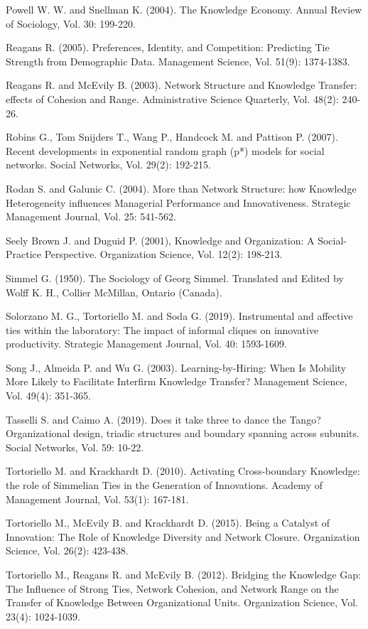 \documentclass{article}
\begin{document}
\begin{hangparas}{.25in}{1}
Powell W. W. and Snellman K. (2004). The Knowledge Economy. Annual Review of Sociology, Vol. 30: 199-220.

Reagans R. (2005). Preferences, Identity, and Competition: Predicting Tie Strength from Demographic Data. Management Science, Vol. 51(9): 1374-1383.

Reagans R. and McEvily B. (2003). Network Structure and Knowledge Transfer: effects of Cohesion and Range. Administrative Science Quarterly, Vol. 48(2): 240-26.

Robins G., Tom Snijders T., Wang P., Handcock M. and Pattison P. (2007). Recent developments in exponential random graph (p*) models for social networks. Social Networks, Vol. 29(2): 192-215.

Rodan S. and Galunic C. (2004). More than Network Structure: how Knowledge Heterogeneity influences Managerial Performance and Innovativeness. Strategic Management Journal, Vol. 25: 541-562.

Seely Brown J. and Duguid P. (2001), Knowledge and Organization: A Social-Practice Perspective. Organization Science, Vol. 12(2): 198-213.

Simmel G. (1950). The Sociology of Georg Simmel. Translated and Edited by Wolff K. H., Collier McMillan, Ontario (Canada).

Solorzano M. G., Tortoriello M. and Soda G. (2019). Instrumental and affective ties within the laboratory: The impact of informal cliques on innovative productivity. Strategic Management Journal, Vol. 40: 1593-1609.

Song J., Almeida P. and Wu G. (2003). Learning-by-Hiring: When Is Mobility More Likely to Facilitate Interfirm Knowledge Transfer? Management Science, Vol. 49(4): 351-365.

Tasselli S. and Caimo A. (2019). Does it take three to dance the Tango? Organizational design, triadic structures and boundary spanning across subunits. Social Networks, Vol. 59: 10-22.

Tortoriello M. and Krackhardt D. (2010). Activating Cross-boundary Knowledge: the role of Simmelian Ties in the Generation of Innovations. Academy of Management Journal, Vol. 53(1): 167-181.

Tortoriello M., McEvily B. and Krackhardt D. (2015). Being a Catalyst of Innovation: The Role of Knowledge Diversity and Network Closure. Organization Science, Vol. 26(2): 423-438.

Tortoriello M., Reagans R. and McEvily B. (2012). Bridging the Knowledge Gap: The Influence of Strong Ties, Network Cohesion, and Network Range on the Transfer of Knowledge Between Organizational Units. Organization Science, Vol. 23(4): 1024-1039.


\end{hangparas}
\end{document}
